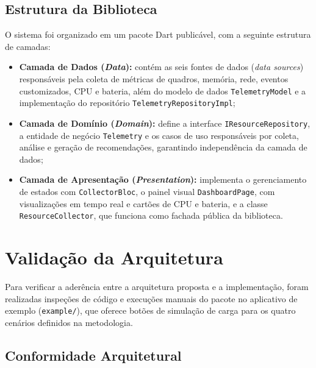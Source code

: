 \subsection{Estrutura da Biblioteca}

O sistema foi organizado em um pacote Dart publicável, com a seguinte estrutura de camadas:

\begin{itemize}
  \item \textbf{Camada de Dados (\textit{Data}):} contém as seis fontes de dados (\textit{data sources}) responsáveis pela coleta de métricas de quadros, memória, rede, eventos customizados, CPU e bateria, além do modelo de dados \texttt{TelemetryModel} e a implementação do repositório \texttt{TelemetryRepositoryImpl};

  \item \textbf{Camada de Domínio (\textit{Domain}):} define a interface \texttt{IResourceRepository}, a entidade de negócio \texttt{Telemetry} e os casos de uso responsáveis por coleta, análise e geração de recomendações, garantindo independência da camada de dados;

  \item \textbf{Camada de Apresentação (\textit{Presentation}):} implementa o gerenciamento de estados com \texttt{CollectorBloc}, o painel visual \texttt{DashboardPage}, com visualizações em tempo real e cartões de CPU e bateria, e a classe \texttt{ResourceCollector}, que funciona como fachada pública da biblioteca.
\end{itemize}

\section{Validação da Arquitetura}

Para verificar a aderência entre a arquitetura proposta e a implementação, foram realizadas inspeções de código e execuções manuais do pacote no aplicativo de exemplo (\texttt{example/}), que oferece botões de simulação de carga para os quatro cenários definidos na metodologia.

\subsection{Conformidade Arquitetural}

